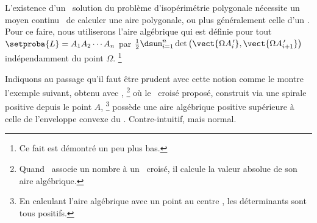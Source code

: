 L'existence d'un \ngone\ solution du problème d'isopérimétrie polygonale nécessite un moyen \og continu \fg\ de calculer une aire polygonale, ou plus généralement celle d'un \ncycle.
Pour ce faire, nous utiliserons l'aire algébrique qui est définie pour tout \ncycle\ $\setproba{L} = A_1 A_2 \cdots A_n$ par $\frac12 \dsum_{i=1}^{n} \det \big( \vect{\Omega A^{\,\prime}_i} , \vect{\Omega A^{\,\prime}_{i+1}} \big)$ indépendamment du point $\Omega$.%
\footnote{
    Ce fait est démontré un peu plus bas.
}

Indiquons au passage qu'il faut être prudent avec cette notion comme le montre l'exemple suivant, obtenu avec \geogebra,%
\footnote{
	Quand \geogebra\ associe un nombre à un \ngone\ croisé, il calcule la valeur absolue de son aire algébrique.
}
où le \ngone\ croisé proposé, construit via une spirale positive depuis le point $A$,%
\footnote{
	En calculant l'aire algébrique avec un point \og au centre \fg, les déterminants sont tous positifs.
} 
possède une aire algébrique positive supérieure à celle de l'enveloppe convexe du \ngone. Contre-intuitif, mais normal.


